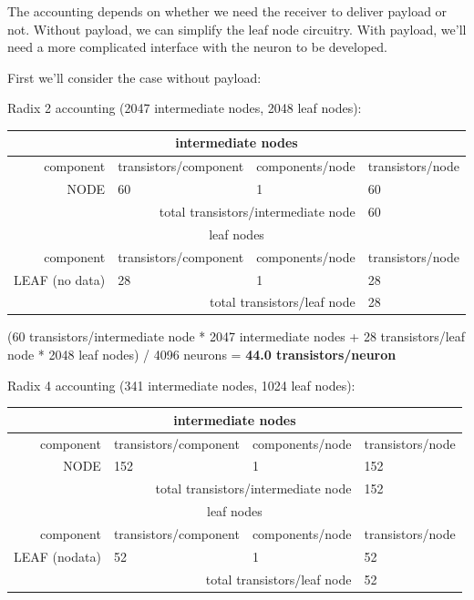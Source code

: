 \documentclass{article}
\begin{document}
The accounting depends on whether we need the receiver to deliver payload or not.
Without payload, we can simplify the leaf node circuitry.
With payload, we'll need a more complicated interface with the neuron to be developed.

First we'll consider the case without payload:

\noindent
Radix 2 accounting (2047 intermediate nodes, 2048 leaf nodes):

\begin{center}
    \begin{tabular}{|r|l|l|l|}
    \hline \multicolumn{4}{|c|}{intermediate nodes} \\ \hline
    component & transistors/component & components/node & transistors/node \\ \hline
    NODE & 60 & 1 & 60 \\ \hline
    \hline \multicolumn{3}{|r|}{total transistors/intermediate node} & 60 \\ \hline
    \hline \multicolumn{4}{|c|}{leaf nodes} \\ \hline
    component & transistors/component & components/node & transistors/node \\ \hline
    LEAF (no data) & 28 & 1 & 28 \\ \hline
    \hline \multicolumn{3}{|r|}{total transistors/leaf node} & 28 \\ \hline
    \end{tabular}
\end{center}

(60 transistors/intermediate node * 2047 intermediate nodes + 28 transistors/leaf node * 2048 leaf nodes) / 4096 neurons = \textbf{44.0 transistors/neuron}

\noindent
Radix 4 accounting (341 intermediate nodes, 1024 leaf nodes):

\begin{center}
    \begin{tabular}{|r|l|l|l|}
    \hline \multicolumn{4}{|c|}{intermediate nodes} \\ \hline
    component & transistors/component & components/node & transistors/node \\ \hline
    NODE & 152 & 1 & 152 \\ \hline
    \hline \multicolumn{3}{|r|}{total transistors/intermediate node} & 152 \\ \hline
    \hline \multicolumn{4}{|c|}{leaf nodes} \\ \hline
    component & transistors/component & components/node & transistors/node \\ \hline
    LEAF (nodata) & 52 & 1 & 52 \\ \hline
    \hline \multicolumn{3}{|r|}{total transistors/leaf node} & 52 \\ \hline
    \end{tabular}
\end{center}
\end{document}
